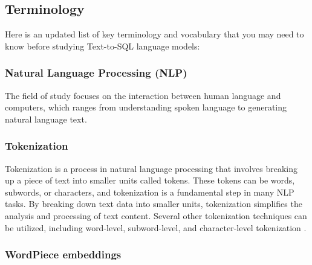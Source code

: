 \subsection{Terminology}

Here is an updated list of key terminology and vocabulary that you may need to know before studying Text-to-SQL language models:

\subsubsection{Natural Language Processing (NLP)}

The field of study focuses on the interaction between human language and computers, which ranges from understanding spoken language to generating natural language text.

\subsubsection{Tokenization}

Tokenization is a process in natural language processing that involves breaking up a piece of text into smaller units called tokens. These tokens can be words, subwords, or characters, and tokenization is a fundamental step in many NLP tasks. By breaking down text data into smaller units, tokenization simplifies the analysis and processing of text content. Several other tokenization techniques can be utilized, including word-level, subword-level, and character-level tokenization \cite{kumar2022deep}.

\subsubsection{WordPiece embeddings}

